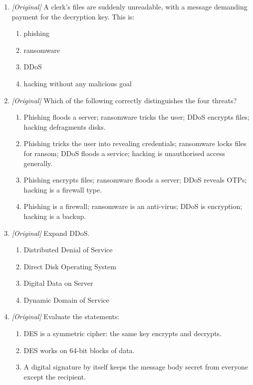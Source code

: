 \begin{enumerate}[label=\textbf{Q\arabic*.}, leftmargin=*]
\begin{enumerate}[label=\Alph*.]
    \item DDoS
    \item disk defragmentation
  \end{enumerate}
\item \textit{[Original]} A clerk's files are suddenly unreadable, with a message demanding payment for the decryption key. This is:
  \begin{enumerate}[label=\Alph*.]
    \item phishing
    \item ransomware
    \item DDoS
    \item hacking without any malicious goal
  \end{enumerate}
\item \textit{[Original]} Which of the following correctly distinguishes the four threats?
  \begin{enumerate}[label=\Alph*.]
    \item Phishing floods a server; ransomware tricks the user; DDoS encrypts files; hacking defragments disks.
    \item Phishing tricks the user into revealing credentials; ransomware locks files for ransom; DDoS floods a service; hacking is unauthorised access generally.
    \item Phishing encrypts files; ransomware floods a server; DDoS reveals OTPs; hacking is a firewall type.
    \item Phishing is a firewall; ransomware is an anti-virus; DDoS is encryption; hacking is a backup.
  \end{enumerate}
\item \textit{[Original]} Expand DDoS.
  \begin{enumerate}[label=\Alph*.]
    \item Distributed Denial of Service
    \item Direct Disk Operating System
    \item Digital Data on Server
    \item Dynamic Domain of Service
  \end{enumerate}
\item \textit{[Original]} Evaluate the statements:
  \begin{enumerate}[label=\Roman*.]
    \item DES is a symmetric cipher: the same key encrypts and decrypts.
    \item DES works on 64-bit blocks of data.
    \item A digital signature by itself keeps the message body secret from everyone except the recipient.

\end{enumerate}
\end{enumerate}
